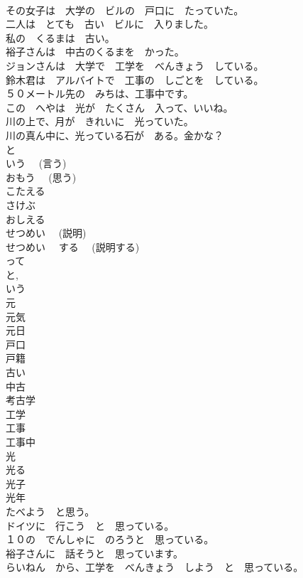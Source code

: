 \documentclass[8pt]{extreport}
\begin{document}
\begin{CJK}{UTF8}{min}
\\	その女子は　大学の　ビルの　戸口に　たっていた。	
\\	二人は　とても　古い　ビルに　入りました。	
\\	私の　くるまは　古い。	
\\	裕子さんは　中古のくるまを　かった。	
\\	ジョンさんは　大学で　工学を　べんきょう　している。	
\\	鈴木君は　アルバイトで　工事の　しごとを　している。	
\\	５０メートル先の　みちは、工事中です。	
\\	この　へやは　光が　たくさん　入って、いいね。	
\\	川の上で、月が　きれいに　光っていた。	
\\	川の真ん中に、光っている石が　ある。金かな？	
\\	と	
\\	いう　 (言う)	
\\	おもう　 (思う)	
\\	こたえる	
\\	さけぶ	
\\	おしえる	
\\	せつめい　 (説明)	
\\	せつめい　 する　 (説明する)	
\\	って	
\\	と, 
\\	いう	
\\	元	
\\	元気	
\\	元日	
\\	戸口	
\\	戸籍	
\\	古い	
\\	中古	
\\	考古学	
\\	工学	
\\	工事	
\\	工事中	
\\	光	
\\	光る	
\\	光子	
\\	光年	
\\	たべよう　と思う。	
\\	ドイツに　行こう　と　思っている。	
\\	１０の　でんしゃに　のろうと　思っている。	
\\	裕子さんに　話そうと　思っています。	
\\	らいねん　から、工学を　べんきょう　しよう　と　思っている。	

\end{CJK}
\end{document}
